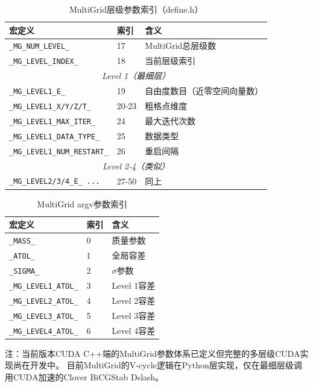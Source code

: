 \documentclass[11pt,a4paper]{article}
\begin{document}
\begin{table}[h]
\centering
\caption{MultiGrid层级参数索引（define.h）}
\label{tab:mg_params}
\begin{tabular}{@{}lll@{}}
\toprule
\textbf{宏定义} & \textbf{索引} & \textbf{含义} \\
\midrule
\texttt{\_MG\_NUM\_LEVEL\_} & 17 & MultiGrid总层级数 \\
\texttt{\_MG\_LEVEL\_INDEX\_} & 18 & 当前层级索引 \\
\multicolumn{3}{c}{\textit{Level 1（最细层）}} \\
\texttt{\_MG\_LEVEL1\_E\_} & 19 & 自由度数目（近零空间向量数）\\
\texttt{\_MG\_LEVEL1\_X/Y/Z/T\_} & 20-23 & 粗格点维度 \\
\texttt{\_MG\_LEVEL1\_MAX\_ITER\_} & 24 & 最大迭代次数 \\
\texttt{\_MG\_LEVEL1\_DATA\_TYPE\_} & 25 & 数据类型 \\
\texttt{\_MG\_LEVEL1\_NUM\_RESTART\_} & 26 & 重启间隔 \\
\multicolumn{3}{c}{\textit{Level 2-4（类似）}} \\
\texttt{\_MG\_LEVEL2/3/4\_E\_ ...} & 27-50 & 同上 \\
\bottomrule
\end{tabular}
\end{table}

\begin{table}[h]
\centering
\caption{MultiGrid argv参数索引}
\label{tab:mg_argv}
\begin{tabular}{@{}lll@{}}
\toprule
\textbf{宏定义} & \textbf{索引} & \textbf{含义} \\
\midrule
\texttt{\_MASS\_} & 0 & 质量参数 \\
\texttt{\_ATOL\_} & 1 & 全局容差 \\
\texttt{\_SIGMA\_} & 2 & $\sigma$参数 \\
\texttt{\_MG\_LEVEL1\_ATOL\_} & 3 & Level 1容差 \\
\texttt{\_MG\_LEVEL2\_ATOL\_} & 4 & Level 2容差 \\
\texttt{\_MG\_LEVEL3\_ATOL\_} & 5 & Level 3容差 \\
\texttt{\_MG\_LEVEL4\_ATOL\_} & 6 & Level 4容差 \\
\bottomrule
\end{tabular}
\end{table}

注：当前版本CUDA C++端的MultiGrid参数体系已定义但完整的多层级CUDA实现尚在开发中。
目前MultiGrid的V-cycle逻辑在Python层实现，仅在最细层级调用CUDA加速的Clover BiCGStab Dslash。
\end{document}
